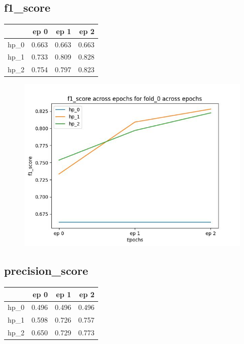\documentclass{article}
\begin{document}
\subsection{f1\_score}
\begin{tabular}{lrrr}
\toprule
{} &   ep 0 &   ep 1 &   ep 2 \\
\midrule
hp\_0 &  0.663 &  0.663 &  0.663 \\
hp\_1 &  0.733 &  0.809 &  0.828 \\
hp\_2 &  0.754 &  0.797 &  0.823 \\
\bottomrule
\end{tabular}

\begin{figure}[H]
\includegraphics[scale = 0.75]{fold_0/f1_score}
\end{figure}
\subsection{precision\_score}
\begin{tabular}{lrrr}
\toprule
{} &   ep 0 &   ep 1 &   ep 2 \\
\midrule
hp\_0 &  0.496 &  0.496 &  0.496 \\
hp\_1 &  0.598 &  0.726 &  0.757 \\
hp\_2 &  0.650 &  0.729 &  0.773 \\
\bottomrule
\end{tabular}
\end{document}
